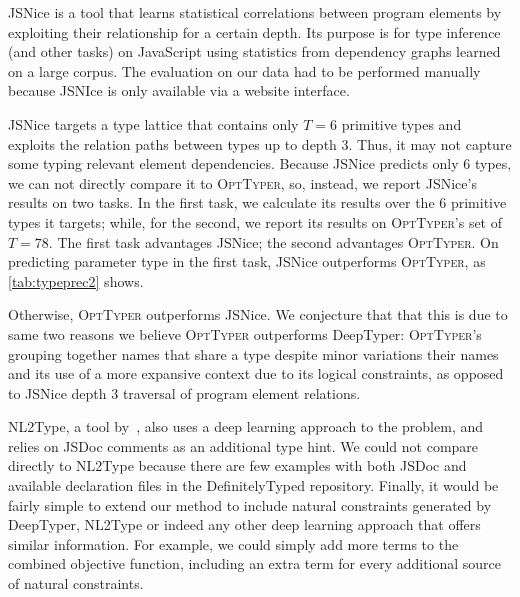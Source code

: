 \documentclass[sigplan,10pt,review,anonymous]{acmart} %
\newcommand{\projectname}{\textsc{OptTyper}\xspace}
\newcommand{\margincomment}[2]{\marginpar{\scriptsize\color{Maroon}#1 says: #2}}
\newcommand{\ivp}[1]{\margincomment{IVP}{#1}}
\theoremstyle{plain}
\theoremstyle{remark}
\theoremstyle{definition}
\begin{document}
JSNice is a tool that learns statistical correlations between program elements
by exploiting their relationship for a certain depth. %
Its purpose is for type inference (and other tasks) on JavaScript
using statistics from dependency graphs learned on a large corpus.
The evaluation on our data had to be performed manually because JSNIce is only available via a website interface.

JSNice targets a type lattice that contains only $T=6$ primitive types and
exploits the relation paths between types up to depth 3.  Thus, it may not
capture some typing relevant element dependencies.  Because JSNice predicts only
$6$ types, we can not directly compare it to \projectname, so, instead,  we
report JSNice's results on two tasks. In the first task, we calculate its
results over the 6 primitive types it targets; while, for the second, we report
its results on \projectname's set of $T=78$.  The first task advantages JSNice;
the second advantages \projectname.  On predicting parameter type in the first
task, JSNice outperforms \projectname, as \cref{tab:typeprec2} shows. 

Otherwise, \projectname outperforms JSNice.  We conjecture that that this is due
to same two reasons we believe \projectname outperforms DeepTyper:
\projectname's grouping together names that share a type despite minor
variations their names and its use of a more expansive context due to its
logical constraints, as opposed to JSNice depth 3 traversal of program element
relations.

NL2Type, a tool by~\cite{malik19}, also uses
a deep learning approach to the problem, and  relies on JSDoc comments as
an additional type hint.
%
We could not compare directly to NL2Type because
there are few examples with both JSDoc and available declaration
files in the DefinitelyTyped repository.
%
Finally, it would be fairly simple to extend our method to include natural constraints generated by DeepTyper, NL2Type or
indeed any other deep learning approach that offers similar information.
For example, we could simply add more terms to the combined objective function,
including an extra term for every additional source of natural constraints.
\end{document}
